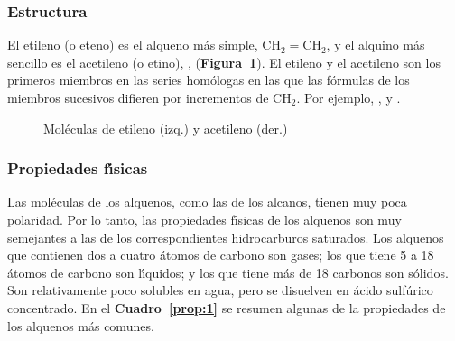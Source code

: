 \subsubsection{Estructura}

El etileno (o eteno) es el alqueno m\'as simple, CH$_2=$CH$_2$, y el alquino m\'as
sencillo es el acetileno (o etino), , (\textbf{F\/igura~\ref{fig3:3}}). El etileno y el
acetileno son los primeros miembros en las series hom\'ologas en las que las f\'ormulas
de los miembros sucesivos difieren por incrementos de CH$_2$. Por ejemplo,
,  y .

\begin{figure}[htb]
\hspace{.5cm}
\caption[Mol\'eculas de etileno y acetileno]{Mol\'eculas de etileno (izq.) y acetileno (der.)}
\label{fig3:3}
\end{figure}

\subsubsection{Propiedades f\'{\i}sicas}

Las mol\'eculas de los alquenos, como las de los alcanos, tienen muy poca polaridad. Por lo tanto, las propiedades f\'{\i}sicas de los alquenos son muy semejantes a las de los correspondientes hidrocarburos saturados. Los alquenos que contienen dos a cuatro \'atomos de carbono son gases; los que tiene 5 a 18 \'atomos de carbono son l\'{\i}quidos; y los que tiene m\'as de 18 carbonos son s\'olidos. Son relativamente poco solubles en agua, pero se disuelven en \'acido sulf\'urico concentrado. En el \textbf{Cuadro~\ref{prop:1}} se resumen algunas de la propiedades de los alquenos m\'as comunes.

